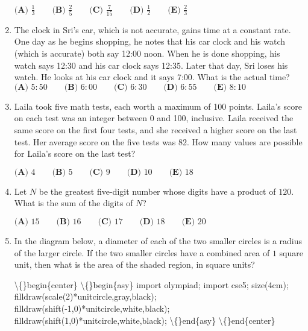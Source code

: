 \documentclass{article}
\begin{document}
\begin{enumerate}[label=\arabic*., itemsep=0.5em]
\(\textbf{(A) } \frac{1}{3} \qquad \textbf{(B) } \frac{2}{5} \qquad \textbf{(C) } \frac{7}{15} \qquad \textbf{(D) } \frac{1}{2} \qquad \textbf{(E) } \frac{2}{3}\)\par \vspace{0.5em}\item The clock in Sri's car, which is not accurate, gains time at a constant rate. One day as he begins shopping, he notes that his car clock and his watch (which is accurate) both say 12:00 noon. When he is done shopping, his watch says 12:30 and his car clock says 12:35. Later that day, Sri loses his watch. He looks at his car clock and it says 7:00. What is the actual time?
\(\textbf{(A) }5:50\qquad\textbf{(B) }6:00\qquad\textbf{(C) }6:30\qquad\textbf{(D) }6:55\qquad \textbf{(E) }8:10\)\par \vspace{0.5em}\item Laila took five math tests, each worth a maximum of 100 points. Laila's score on each test was an integer between 0 and 100, inclusive. Laila received the same score on the first four tests, and she received a higher score on the last test. Her average score on the five tests was 82. How many values are possible for Laila's score on the last test?

\(\textbf{(A) }4\qquad\textbf{(B) }5\qquad\textbf{(C) }9\qquad\textbf{(D) }10\qquad \textbf{(E) }18\)\par \vspace{0.5em}\item Let \(N\) be the greatest five-digit number whose digits have a product of \(120\). What is the sum of the digits of \(N\)?

\(\textbf{(A) }15\qquad\textbf{(B) }16\qquad\textbf{(C) }17
\qquad\textbf{(D) }18\qquad\textbf{(E) }20\)\par \vspace{0.5em}\item In the diagram below, a diameter of each of the two smaller circles is a radius of the larger circle. If the two smaller circles have a combined area of \(1\) square unit, then what is the area of the shaded region, in square units?


\textbackslash\{\}begin\{center\}
\textbackslash\{\}begin\{asy\}
import olympiad;
import cse5;
size(4cm);
filldraw(scale(2)*unitcircle,gray,black);
filldraw(shift(-1,0)*unitcircle,white,black);
filldraw(shift(1,0)*unitcircle,white,black);
\textbackslash\{\}end\{asy\}
\textbackslash\{\}end\{center\}



\end{enumerate}
\end{document}
